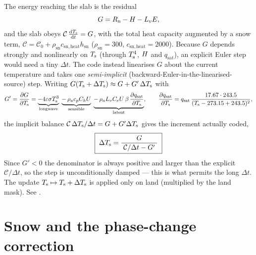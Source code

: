 The energy reaching the slab is the residual
\begin{equation}
  G = R_{\mathrm n} - H - L_v E,
\end{equation}
and the slab obeys $\mathcal{C}\,\frac{\mathrm{d}T_{\mathrm s}}{\mathrm{d}t} = G$, with the total heat capacity
augmented by a snow term,
$\mathcal{C} = \mathcal{C}_0 + \rho_{\mathrm{sn}} c_{\mathrm{sn,heat}}
h_{\mathrm{sn}}$ ($\rho_{\mathrm{sn}}=300$, $c_{\mathrm{sn,heat}}=2000$). Because
$G$ depends strongly and nonlinearly on $T_{\mathrm s}$ (through $T_{\mathrm s}^4$, $H$ and
$q_{\mathrm{sat}}$), an explicit Euler step would need a tiny $\Delta t$. The
code instead linearises $G$ about the current temperature and takes one
\emph{semi-implicit} (backward-Euler-in-the-linearised-source) step. Writing
$G(T_{\mathrm s}+\Delta T_{\mathrm s})\approx G + G'\,\Delta T_{\mathrm s}$ with
\begin{equation}
  G' = \frac{\partial G}{\partial T_{\mathrm s}} =
       \underbrace{-4\varepsilon\sigma T_{\mathrm s}^3}_{\text{longwave}}
       \;\underbrace{-\,\rho_a c_p C_h U}_{\text{sensible}}
       \;\underbrace{-\,\rho_a L_v C_e U\,\beta\,\frac{\partial q_{\mathrm{sat}}}{\partial T_{\mathrm s}}}_{\text{latent}},
  \qquad
  \frac{\partial q_{\mathrm{sat}}}{\partial T_{\mathrm s}} = q_{\mathrm{sat}}\,\frac{17.67\cdot 243.5}{(T_{\mathrm s}-273.15+243.5)^2},
  \label{eq:dgdt}
\end{equation}
the implicit balance $\mathcal{C}\,\Delta T_{\mathrm s}/\Delta t = G + G'\Delta T_{\mathrm s}$
gives the increment actually coded,
\begin{equation}
  \boxed{\;\Delta T_{\mathrm s} = \frac{G}{\;\mathcal{C}/\Delta t - G'\;}\;}
  \label{eq:dtemp}
\end{equation}
Since $G'<0$ the denominator is always positive and larger than the explicit
$\mathcal{C}/\Delta t$, so the step is unconditionally damped --- this is what
permits the long $\Delta t$. The update $T_{\mathrm s} \mapsto T_{\mathrm s} + \Delta T_{\mathrm s}$ is
applied only on land (multiplied by the land mask). See
.

\section{Snow and the phase-change correction}

